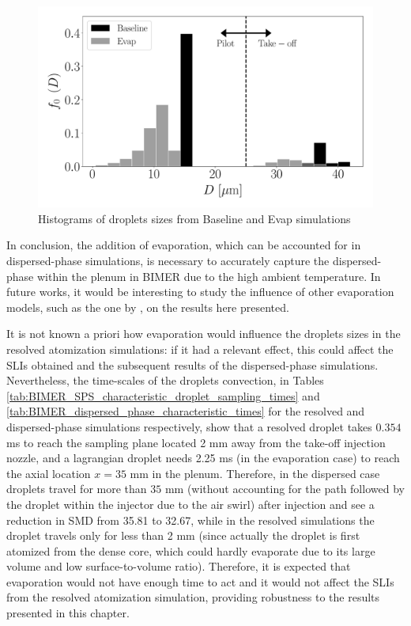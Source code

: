 \begin{figure}[ht]
   \centering
   \includegraphics[scale=0.4]{./part3_applications/figures_ch9_lagrangian/droplets_histograms}
   \caption{Histograms of droplets sizes from Baseline and Evap simulations}
   \label{fig:LGS_BIMER_droplets_histograms}
\end{figure}

In conclusion, the addition of evaporation, which can be accounted for in dispersed-phase simulations, is necessary to accurately capture the dispersed-phase within the plenum in BIMER due to the high ambient temperature. In future works, it would be interesting to study the influence of other evaporation models, such as the one by , on the results here presented. 

It is not known a priori how evaporation would influence the droplets sizes in the resolved atomization simulations: if it had a relevant effect, this could affect the SLIs obtained and the subsequent results of the dispersed-phase simulations. Nevertheless, the time-scales of the droplets convection, in Tables \ref{tab:BIMER_SPS_characteristic_droplet_sampling_times} and \ref{tab:BIMER_dispersed_phase_characteristic_times} for the resolved and dispersed-phase simulations respectively, show that a resolved droplet takes $0.354$ ms to reach the sampling plane located 2 mm  away from the take-off injection nozzle, and a lagrangian droplet needs 2.25 ms (in the evaporation case) to reach the axial location $x = 35$ mm in the plenum. Therefore, in the dispersed case droplets travel for more than $35$ mm (without accounting for the path followed by the droplet within the injector due to the air swirl) after injection and see a reduction in SMD from 35.81 to 32.67, while in the resolved simulations the droplet travels only for less than 2 mm (since actually the droplet is first atomized from the dense core, which could hardly evaporate due to its large volume and low surface-to-volume ratio). Therefore, it is expected that evaporation would not have enough time to act and it would not affect the SLIs from the resolved atomization simulation, providing robustness to the results presented in this chapter.

